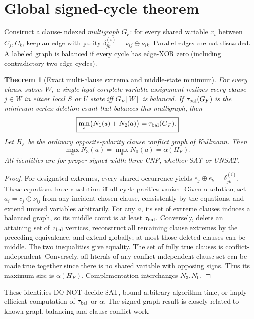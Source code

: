 \documentclass[10pt]{article}
\newtheorem{theorem}{Theorem}
\begin{document}
\section{Global signed-cycle theorem}
Construct a clause-indexed \emph{multigraph} \(G_F\): for every shared variable \(x_i\) between \(C_j,C_k\), keep an edge with parity \(\delta_{jk}^{(i)}=\nu_{ij}\oplus\nu_{ik}\). Parallel edges are not discarded. A labeled graph is balanced if every cycle has edge-XOR zero (including contradictory two-edge cycles).
\begin{theorem}[Exact multi-clause extrema and middle-state minimum]
For every clause subset \(W\), a single legal complete variable assignment realizes every clause \(j\in W\) in either local \(S\) or \(U\) state iff \(G_F[W]\) is balanced. If \(\tau_{\rm bal}(G_F)\) is the minimum vertex-deletion count that balances this multigraph, then
\[
\boxed{\min_a\bigl(N_1(a)+N_2(a)\bigr)=\tau_{\rm bal}(G_F).}
\]
Let \(H_F\) be the ordinary opposite-polarity clause conflict graph of Kullmann. Then
\[
\boxed{\max_a N_3(a)=\max_a N_0(a)=\alpha(H_F).}
\]
All identities are for proper signed width-three CNF, whether SAT or UNSAT.
\end{theorem}
\begin{proof}
For designated extremes, every shared occurrence yields \(e_j\oplus e_k=\delta_{jk}^{(i)}\). These equations have a solution iff all cycle parities vanish. Given a solution, set \(a_i=e_j\oplus\nu_{ij}\) from any incident chosen clause, consistently by the equations, and extend unused variables arbitrarily.
For any \(a\), its set of extreme clauses induces a balanced graph, so its middle count is at least \(\tau_{\rm bal}\). Conversely, delete an attaining set of \(\tau_{\rm bal}\) vertices, reconstruct all remaining clause extremes by the preceding equivalence, and extend globally; at most those deleted clauses can be middle. The two inequalities give equality.
The set of fully true clauses is conflict-independent. Conversely, all literals of any conflict-independent clause set can be made true together since there is no shared variable with opposing signs. Thus its maximum size is \(\alpha(H_F)\). Complementation interchanges \(N_3,N_0\).
\end{proof}
These identities DO NOT decide SAT, bound arbitrary algorithm time, or imply efficient computation of \(\tau_{\rm bal}\) or \(\alpha\). The signed graph result is closely related to known graph balancing and clause conflict work.
\end{document}

